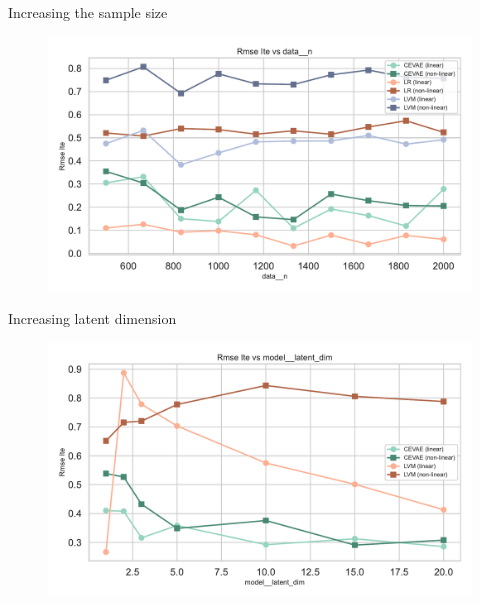 \documentclass[10pt]{beamer}
\begin{document}

\begin{frame}{Increasing the sample size}
  \begin{figure}[H]
      \includegraphics[width=\textwidth]{images/MyRun_data__n--rmse_ite.pdf}
    \end{figure}
\end{frame}


\begin{frame}{Increasing latent dimension}
    \begin{figure}[H]
      \includegraphics[width=\textwidth]{images/MyRun_model__latent_dim--rmse_ite.pdf}
    \end{figure}
\end{frame}
\end{document}
